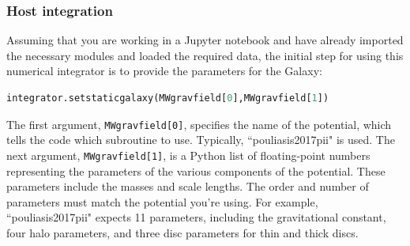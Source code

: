 \subsubsection*{Host integration}
Assuming that you are working in a Jupyter notebook and have already imported the necessary modules and loaded the required data, the initial step for using this numerical integrator is to provide the parameters for the Galaxy:
\begin{lstlisting}[language=python]
    integrator.setstaticgalaxy(MWgravfield[0],MWgravfield[1])
\end{lstlisting}
The first argument, \texttt{MWgravfield[0]}, specifies the name of the potential, which tells the code which subroutine to use. Typically, ``pouliasis2017pii" is used. The next argument, \texttt{MWgravfield[1]}, is a Python list of floating-point numbers representing the parameters of the various components of the potential. These parameters include the masses and scale lengths. The order and number of parameters must match the potential you're using. For example, ``pouliasis2017pii" expects 11 parameters, including the gravitational constant, four halo parameters, and three disc parameters for thin and thick discs.

